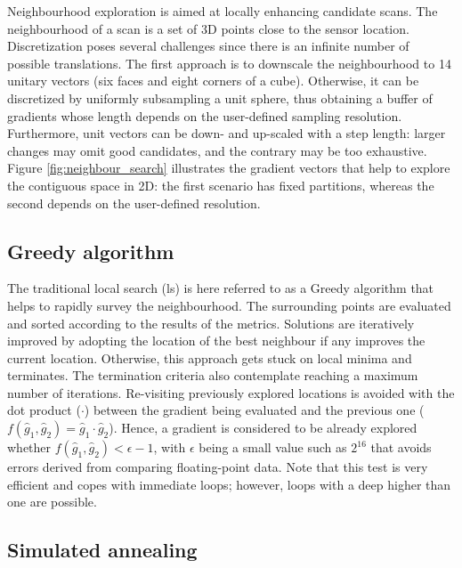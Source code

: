 Neighbourhood exploration is aimed at locally enhancing candidate scans. The neighbourhood of a scan is a set of 3D points close to the sensor location. Discretization poses several challenges since there is an infinite number of possible translations. The first approach is to downscale the neighbourhood to 14 unitary vectors (six faces and eight corners of a cube). Otherwise, it can be discretized by uniformly subsampling a unit sphere, thus obtaining a buffer of gradients whose length depends on the user-defined sampling resolution. Furthermore, unit vectors can be down- and up-scaled with a step length: larger changes may omit good candidates, and the contrary may be too exhaustive. Figure \ref{fig:neighbour_search} illustrates the gradient vectors that help to explore the contiguous space in 2D: the first scenario has fixed partitions, whereas the second depends on the user-defined resolution.

\subsection{Greedy algorithm}

The traditional local search (\acrshort{ls}) is here referred to as a Greedy algorithm that helps to rapidly survey the neighbourhood. The surrounding points are evaluated and sorted according to the results of the metrics. Solutions are iteratively improved by adopting the location of the best neighbour if any improves the current location. Otherwise, this approach gets stuck on local minima and terminates. The termination criteria also contemplate reaching a maximum number of iterations. Re-visiting previously explored locations is avoided with the dot product ($\cdot$) between the gradient being evaluated and the previous one ($f(\hat{g}_1, \hat{g}_2) = \hat{g}_1 \cdot \hat{g}_2$). Hence, a gradient is considered to be already explored whether $f(\hat{g}_1, \hat{g}_2) < \epsilon - 1$, with $\epsilon$ being a small value such as $2^{16}$ that avoids errors derived from comparing floating-point data. Note that this test is very efficient and copes with immediate loops; however, loops with a deep higher than one are possible.

\subsection{Simulated annealing}

